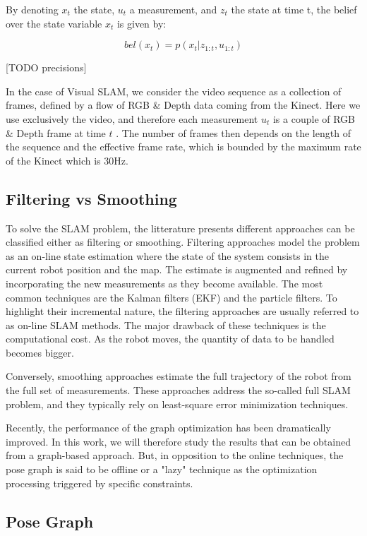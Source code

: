 By denoting $x_t$ the state, $u_t$ a measurement, and $z_t$ the state at time t, the belief over the state variable $x_t$ is given by:

\[bel(x_t) = p(x_t | z_{1:t}, u_{1:t})\]

[TODO precisions]

In the case of Visual SLAM, we consider the video sequence as a collection of frames, defined by a flow of RGB \& Depth data coming from the Kinect. Here we use exclusively the video, and therefore each measurement $u_t$ is a couple of RGB \& Depth frame at time $t$ . The number of frames then depends on the length of the sequence and the effective frame rate, which is bounded by the maximum rate of the Kinect which is 30Hz.


\subsection{Filtering vs Smoothing}

To solve the SLAM problem, the litterature presents different approaches can be classified either as filtering or smoothing. Filtering approaches model the problem as an on-line state estimation where the state of the system consists in the current robot position and the map. The estimate is augmented and refined by incorporating the new measurements as they become available.
The most common techniques are the Kalman filters (EKF) and the particle filters. To highlight their incremental nature, the filtering approaches are usually referred to as on-line SLAM methods.
The major drawback of these techniques is the computational cost. As the robot moves, the quantity of data to be handled becomes bigger.

Conversely, smoothing approaches estimate the full trajectory of the robot from the full set of measurements. These approaches address the so-called full SLAM problem, and they typically rely on least-square error minimization techniques.

Recently, the performance of the graph optimization has been dramatically improved. In this work, we will therefore study the results that can be obtained from a graph-based approach. But, in opposition to the online techniques, the pose graph is said to be offline or a "lazy" technique as the optimization processing triggered by specific constraints.

\subsection{Pose Graph}

